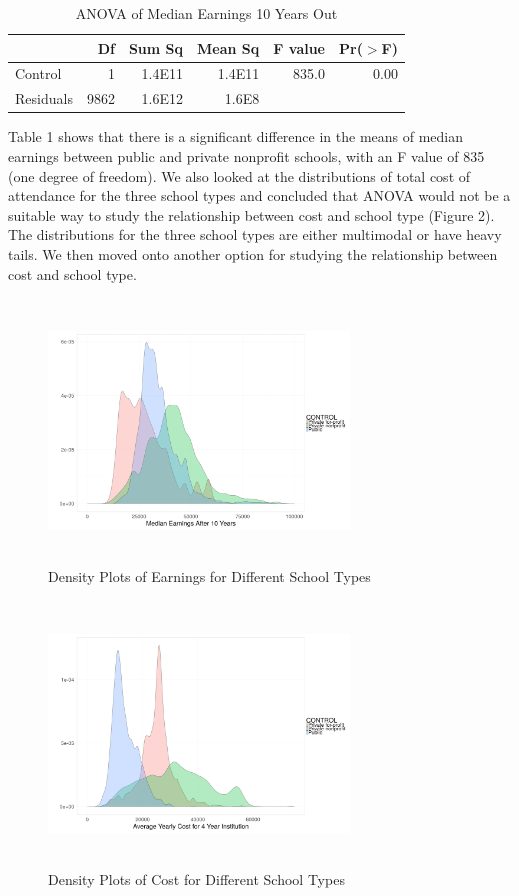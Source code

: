 \documentclass[%
 reprint,
 amsmath,amssymb,
 aps,
]{revtex4-1}
\begin{document}
\begin{table}[ht]
	\caption{ANOVA of Median Earnings 10 Years Out}
	\label{Table 1}
	\centering
	\begin{tabular}{lrrrrr}
		  \hline
		   & Df & Sum Sq & Mean Sq & F value & Pr($>$F) \\ 
		     \hline
		     Control & 1 & 1.4E11 & 1.4E11 & 835.0 & 0.00 \\ 
		       Residuals & 9862 & 1.6E12 & 1.6E8 &  &  \\ 
		          \hline
	\end{tabular}
\end{table}


Table 1 shows that there is a significant difference in the means of median earnings between public and private nonprofit schools, with an F value of 835 (one degree of freedom).  We also looked at the distributions of total cost of attendance for the three school types and concluded that ANOVA would not be a suitable way to study the relationship between cost and school type (Figure 2).  The distributions for the three school types are either multimodal or have heavy tails.  We then moved onto another option for studying the relationship between cost and school type.

\begin{figure}[h]
\caption{Density Plots of Earnings for Different School Types}
\includegraphics[width=8cm, height=7cm]{earnings.png}
\end{figure}

\begin{figure}[h]
\caption{Density Plots of Cost for Different School Types}
\includegraphics[width=8cm, height=7cm]{cost.png}
\end{figure}
\end{document}
